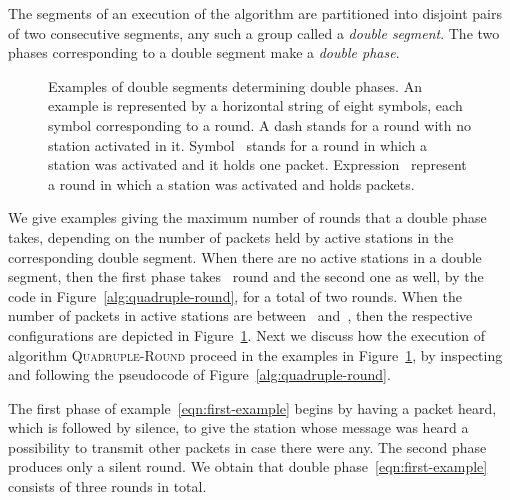 \documentclass[11pt]{article}
\newcommand{\FFF}{\vspace*{\bigskipamount}}
\newlength{\captionwidth}
\begin{document}
The segments of an execution of the algorithm are partitioned into disjoint pairs of two consecutive segments, any such a group called a \emph{double segment}.
The two phases corresponding to a double segment make a \emph{double phase}.




\newlength{\examplewidth}
\setlength{\examplewidth}{\textwidth}
\addtolength{\examplewidth}{-20em}

\begin{figure}[t]
\begin{center}
\begin{minipage}{\examplewidth}

\end{minipage}

\FFF

\parbox{\captionwidth}{\caption{\label{fig:quadruple-examples}
Examples of double segments determining double phases.
An example is represented by a horizontal string of eight symbols, each symbol corresponding to a round.
A dash stands for a round with no station activated in it.
Symbol~ stands for a round in which a station was activated and it holds one packet.
Expression~ represent a round in which a station was activated and holds  packets.
}}
\end{center}
\end{figure}

We give examples giving the maximum number of rounds that a double phase takes, depending on the number of packets held by active stations in the corresponding double segment.
When there are no active stations in a double segment, then the first phase takes~ round and the second one as well, by the code in Figure~\ref{alg:quadruple-round}, for a total of two rounds.
When the number of packets in active stations are between~ and~, then the respective configurations are depicted in Figure~\ref{fig:quadruple-examples}.
Next we discuss how the execution of algorithm \textsc{Quadruple-Round} proceed in the examples in Figure~\ref{fig:quadruple-examples}, by inspecting and following the pseudocode of Figure~\ref{alg:quadruple-round}.


The first phase of example~\eqref{eqn:first-example} begins by having a packet heard, which is followed by silence, to give the station whose message was heard a possibility to transmit other packets in case there were any. 
The second phase produces only a silent round.
We obtain that double phase~\eqref{eqn:first-example} consists of three rounds in total.
\end{document}

